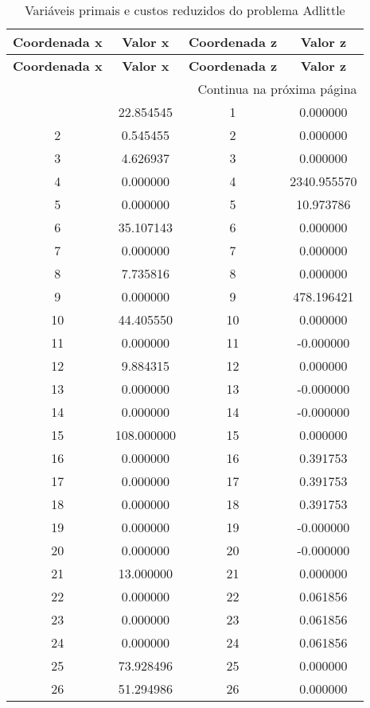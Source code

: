 \documentclass[12pt]{article}
\begin{document}
\begin{longtable}{@{}cccc@{}}
\caption{Variáveis primais e custos reduzidos do problema Adlittle} \\
\toprule
\textbf{Coordenada x} & \textbf{Valor x} & \textbf{Coordenada z} & \textbf{Valor z} \\
\midrule
\endfirsthead

\toprule
\textbf{Coordenada x} & \textbf{Valor x} & \textbf{Coordenada z} & \textbf{Valor z} \\
\midrule
\endhead

\midrule \multicolumn{4}{r}{{Continua na próxima página}} \\ \midrule
\endfoot

\bottomrule
\endlastfoot
1 & 22.854545 & 1 & 0.000000 \\
2 & 0.545455 & 2 & 0.000000 \\
3 & 4.626937 & 3 & 0.000000 \\
4 & 0.000000 & 4 & 2340.955570 \\
5 & 0.000000 & 5 & 10.973786 \\
6 & 35.107143 & 6 & 0.000000 \\
7 & 0.000000 & 7 & 0.000000 \\
8 & 7.735816 & 8 & 0.000000 \\
9 & 0.000000 & 9 & 478.196421 \\
10 & 44.405550 & 10 & 0.000000 \\
11 & 0.000000 & 11 & -0.000000 \\
12 & 9.884315 & 12 & 0.000000 \\
13 & 0.000000 & 13 & -0.000000 \\
14 & 0.000000 & 14 & -0.000000 \\
15 & 108.000000 & 15 & 0.000000 \\
16 & 0.000000 & 16 & 0.391753 \\
17 & 0.000000 & 17 & 0.391753 \\
18 & 0.000000 & 18 & 0.391753 \\
19 & 0.000000 & 19 & -0.000000 \\
20 & 0.000000 & 20 & -0.000000 \\
21 & 13.000000 & 21 & 0.000000 \\
22 & 0.000000 & 22 & 0.061856 \\
23 & 0.000000 & 23 & 0.061856 \\
24 & 0.000000 & 24 & 0.061856 \\
25 & 73.928496 & 25 & 0.000000 \\
26 & 51.294986 & 26 & 0.000000 \\

\end{longtable}
\end{document}
